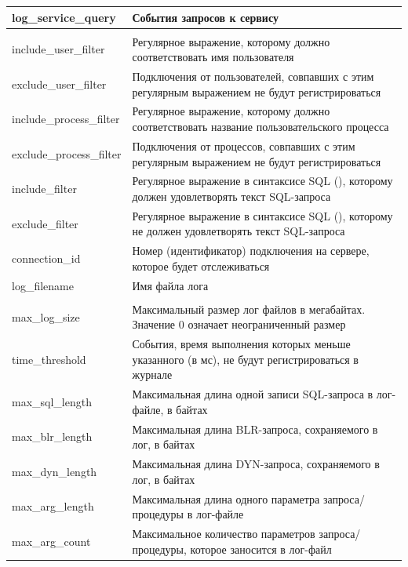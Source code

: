 \begin{longtable}[r]{|>{\ttfamily}m{5cm}|m{10.5cm}|}
	log\_service\_query & События запросов к сервису \\\hline
	\rowcolor[gray]{.9}\multicolumn{2}{|m{15.75cm}|}{\bfseries Filters}\\\hline
	include\_user\_filter & Регулярное выражение, которому должно соответствовать имя пользователя \\\hline
	exclude\_user\_filter &  Подключения от пользователей, совпавших с этим регулярным выражением не будут регистрироваться \\\hline
	include\_process\_filter &  Регулярное выражение, которому должно соответствовать название пользовательского процесса  \\\hline
	exclude\_process\_filter & Подключения от процессов, совпавших с этим регулярным выражением не будут регистрироваться  \\\hline
	include\_filter &  Регулярное выражение в синтаксисе SQL (\ttt{SIMILAR TO}), которому должен удовлетворять текст SQL-запроса \\\hline
	exclude\_filter & Регулярное выражение в синтаксисе SQL (\ttt{SIMILAR TO}), которому не должен удовлетворять текст SQL-запроса  \\\hline
	connection\_id &  Номер (идентификатор) подключения на сервере, которое
	будет отслеживаться \\\hline
	log\_filename &  Имя файла лога \\\hline
	\rowcolor[gray]{.9}\multicolumn{2}{|m{15.75cm}|}{\bfseries Int Values}\\\hline
	max\_log\_size &   Максимальный размер лог файлов в мегабайтах. Значение 0 означает неограниченный размер \\\hline
	time\_threshold & События, время выполнения которых меньше указанного (в мс), не будут регистрироваться в журнале  \\\hline
	max\_sql\_length & Максимальная длина одной записи SQL-запроса в лог-файле,	в байтах  \\\hline
	max\_blr\_length & Максимальная длина BLR-запроса, сохраняемого в лог, в байтах \\\hline
	max\_dyn\_length & Максимальная длина DYN-запроса, сохраняемого в лог, в байтах \\\hline
	max\_arg\_length & Максимальная длина одного параметра запроса/процедуры в
	лог-файле \\\hline
	max\_arg\_count & Максимальное количество параметров запроса/процедуры, которое заносится в лог-файл  \\\hline
\end{longtable}

